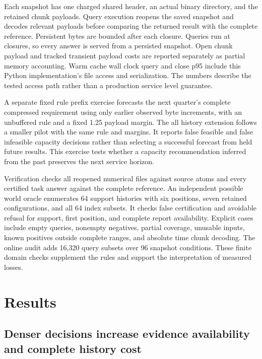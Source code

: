 \documentclass[a4paper,fleqn]{cas-dc}
\begin{document}
Each snapshot has one charged shared header, an actual binary directory, and the retained chunk payloads. Query execution reopens the saved snapshot and decodes relevant payloads before comparing the returned result with the complete reference. Persistent bytes are bounded after each closure. Queries run at closures, so every answer is served from a persisted snapshot. Open chunk payload and tracked transient payload costs are reported separately as partial memory accounting. Warm cache wall clock query and close p95 include this Python implementation's file access and serialization. The numbers describe the tested access path rather than a production service level guarantee.

A separate fixed rule prefix exercise forecasts the next quarter's complete compressed requirement using only earlier observed byte increments, with an unbuffered rule and a fixed 1.25 payload margin. The all history extension follows a smaller pilot with the same rule and margins. It reports false feasible and false infeasible capacity decisions rather than selecting a successful forecast from held future results. This exercise tests whether a capacity recommendation inferred from the past preserves the next service horizon.

Verification checks all reopened numerical files against source atoms and every certified task answer against the complete reference. An independent possible world oracle enumerates 64 support histories with six positions, seven retained configurations, and all 64 index subsets. It checks false certification and avoidable refusal for support, first position, and complete report availability. Explicit cases include empty queries, nonempty negatives, partial coverage, unusable inputs, known positives outside complete ranges, and absolute time chunk decoding. The online audit adds 16{,}320 query subsets over 96 snapshot conditions. These finite domain checks supplement the rules and support the interpretation of measured losses.

\section{Results}\label{sec:results}

\subsection{Denser decisions increase evidence availability and complete history cost}
\end{document}
